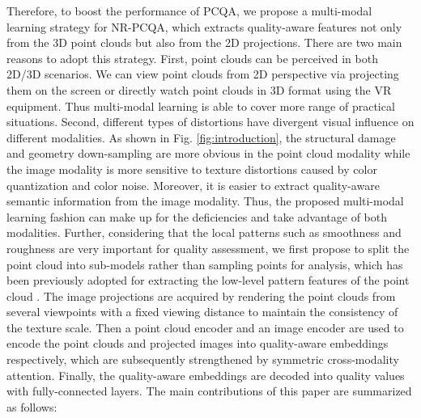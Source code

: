 \documentclass{article}
\begin{document}
Therefore, to boost the performance of PCQA, we propose a multi-modal learning strategy for NR-PCQA, which extracts quality-aware features not only from the 3D point clouds but also from the 2D projections. There are two main reasons to adopt this strategy. First, point clouds can be perceived in both 2D/3D scenarios. We can view point clouds from 2D perspective via projecting them on the screen or directly watch point clouds in 3D format using the VR equipment. Thus multi-modal learning is able to cover more range of practical situations. Second, different types of distortions have divergent visual influence on different modalities. As shown in Fig. \ref{fig:introduction}, the structural damage and geometry down-sampling are more obvious in the point cloud modality while the image modality is more sensitive to texture distortions caused by color quantization and color noise. Moreover, it is easier to extract quality-aware semantic information from the image modality. Thus, the proposed multi-modal learning fashion can make up for the deficiencies and take advantage of both modalities.
 Further, considering that the local patterns such as smoothness and roughness are very important for quality assessment, we first propose to split the point cloud into sub-models rather than sampling points for analysis, which has been previously adopted for extracting the low-level pattern features of the point cloud \cite{chetouani2021deep,you2021patch}. The image projections are acquired by rendering the point clouds from several viewpoints with a fixed viewing distance to maintain the consistency of the texture scale. Then a point cloud encoder and an image encoder are used to encode the point clouds and projected images into quality-aware embeddings respectively, which are subsequently strengthened by symmetric cross-modality attention. Finally, the quality-aware embeddings are decoded into quality values with fully-connected layers. The main contributions of this paper are summarized as follows:
\end{document}
